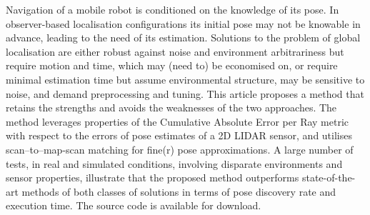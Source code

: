 Navigation of a mobile robot is conditioned on the knowledge of its pose. In
observer-based localisation configurations its initial pose may not be knowable
in advance, leading to the need of its estimation. Solutions to the problem of
global localisation are either robust against noise and environment
arbitrariness but require motion and time, which may (need to) be economised
on, or require minimal estimation time but assume environmental structure, may
be sensitive to noise, and demand preprocessing and tuning. This article
proposes a method that retains the strengths and avoids the weaknesses of the
two approaches. The method leverages properties of the Cumulative Absolute
Error per Ray metric with respect to the errors of pose estimates of a 2D LIDAR
sensor, and utilises scan--to--map-scan matching for fine(r) pose
approximations.  A large number of tests, in real and simulated conditions,
involving disparate environments and sensor properties, illustrate that the
proposed method outperforms state-of-the-art methods of both classes of
solutions in terms of pose discovery rate and execution time. The source code
is available for download.
